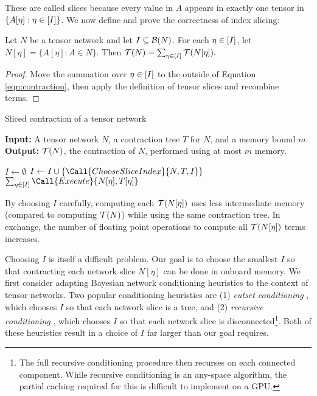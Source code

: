 These are called slices because every value in $A$ appears in exactly one tensor in $\{ A[\eta] : \eta \in [I] \}$. We now define and prove the correctness of index slicing: 
\begin{theorem}
Let $N$ be a tensor network and let $I \subseteq \mathcal{B}(N)$. For each $\eta \in [I]$, let $N[\eta] = \{ A[\eta] : A \in N\}$. Then $\mathcal{T}(N) = \sum_{\eta \in [I]} \mathcal{T}(N[\eta]).$
\end{theorem}
\begin{proof}
Move the summation over $\eta \in [I]$ to the outside of Equation \ref{eqn:contraction}, then apply the definition of tensor slices and recombine terms.
\end{proof}

\begin{algorithm}[t]
	\caption{Sliced contraction of a tensor network}\label{alg:tn-sliced}
	\textbf{Input:} A tensor network $N$, a contraction tree $T$ for $N$, and a memory bound $m$. \\
	\textbf{Output:} $\mathcal{T}(N)$, the contraction of $N$, performed using at most $m$ memory.
	\begin{algorithmic}[1]
	    \State $I \gets \emptyset$
	    \State $I \gets I \cup \{\Call{ChooseSliceIndex}{N, T, I}\}$
	    \EndWhile
	    \State \Return $\sum_{\eta \in [I]} \Call{Execute}{N[\eta], T[\eta]}$
	\end{algorithmic}
\end{algorithm}

By choosing $I$ carefully, computing each $\mathcal{T}(N[\eta])$ uses less intermediate memory (compared to computing $\mathcal{T}(N)$) while using the same contraction tree. In exchange, the number of floating point operations to compute all $\mathcal{T}(N[\eta])$ terms increases. 

Choosing $I$ is itself a difficult problem. Our goal is to choose the smallest $I$ so that contracting each network slice $N[\eta]$ can be done in onboard memory. We first consider adapting Bayesian network conditioning heuristics to the context of tensor networks. Two popular conditioning heuristics are (1) \emph{cutset conditioning} \cite{pearl86}, which chooses $I$ so that each network slice is a tree, and (2) \emph{recursive conditioning} \cite{darwiche01}, which chooses $I$ so that each network slice is disconnected\footnote{The full recursive conditioning procedure then recurses on each connected component. While recursive conditioning is an any-space algorithm, the partial caching required for this is difficult to implement on a GPU.}. Both of these heuristics result in a choice of $I$ far larger than our goal requires. 


